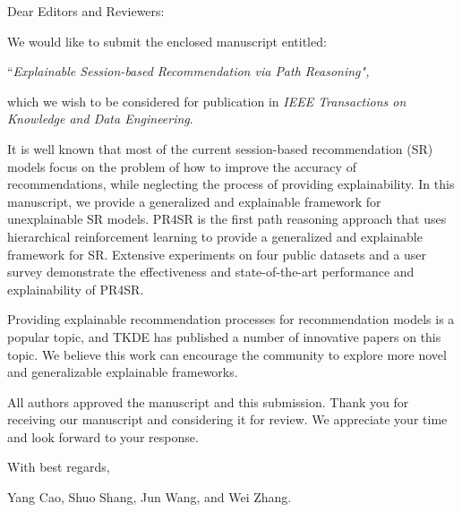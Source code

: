 \documentclass[11pt]{article}
\begin{document}
\hspace{-1.5em}Dear Editors and Reviewers:

\vspace{1em} We would like to submit the enclosed manuscript entitled:

\vspace{1em}
 
``\emph{Explainable Session-based Recommendation via Path Reasoning",} 

\vspace{1em}

\noindent which we wish to be considered for publication in
\emph{IEEE Transactions on Knowledge and Data Engineering}. 

\vspace{.5em}

It is well known that most of the current session-based recommendation (SR) models focus on the problem of how to improve the accuracy of recommendations, while neglecting the process of providing explainability. In this manuscript, we provide a generalized and explainable framework for unexplainable SR models. PR4SR is the first path reasoning approach that uses hierarchical reinforcement learning to provide a generalized and explainable framework for SR. Extensive experiments on four public datasets and a user survey demonstrate the effectiveness and state-of-the-art performance and explainability of PR4SR.

Providing explainable recommendation processes for recommendation models is a popular topic, and TKDE has published a number of innovative papers on this topic. We believe this work can encourage the community to explore more novel and generalizable explainable frameworks.

All authors approved the manuscript and this submission. 
Thank you for receiving our manuscript and considering it for review.
We appreciate your time and look forward to your response.

\vspace{2em}


\hspace{-1.5em}With best regards, \vspace{1em}

\hspace{-1.5em}Yang Cao, Shuo Shang, Jun Wang, and Wei Zhang.
 
\end{document}
